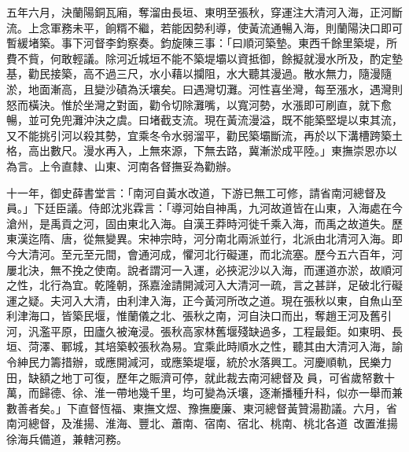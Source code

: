 \begin{pinyinscope}
五年六月，決蘭陽銅瓦廂，奪溜由長垣、東明至張秋，穿運注大清河入海，正河斷流。上念軍務未平，餉糈不繼，若能因勢利導，使黃流通暢入海，則蘭陽決口即可暫緩堵築。事下河督李鈞察奏。鈞旋陳三事：「曰順河築墊。東西千餘里築堤，所費不貲，何敢輕議。除河近城垣不能不築堤壩以資抵御，餘擬就漫水所及，酌定墊基，勸民接築，高不過三尺，水小藉以攔阻，水大聽其漫過。散水無力，隨漫隨淤，地面漸高，且變沙磧為沃壤矣。曰遇灣切灘。河性喜坐灣，每至漲水，遇灣則怒而橫決。惟於坐灣之對面，勸令切除灘嘴，以寬河勢，水漲即可刷直，就下愈暢，並可免兜灘沖決之虞。曰堵截支流。現在黃流漫溢，既不能築堅堤以束其流，又不能挑引河以殺其勢，宜乘冬令水弱溜平，勸民築壩斷流，再於以下溝槽跨築土格，高出數尺。漫水再入，上無來源，下無去路，冀漸淤成平陸。」東撫崇恩亦以為言。上令直隸、山東、河南各督撫妥為勸辦。

十一年，御史薛書堂言：「南河自黃水改道，下游已無工可修，請省南河總督及員。」下廷臣議。侍郎沈兆霖言：「導河始自神禹，九河故道皆在山東，入海處在今滄州，是禹貢之河，固由東北入海。自漢王莽時河徙千乘入海，而禹之故道失。歷東漢迄隋、唐，從無變異。宋神宗時，河分南北兩派並行，北派由北清河入海。即今大清河。至元至元間，會通河成，懼河北行礙運，而北流塞。歷今五六百年，河屢北決，無不挽之使南。說者謂河一入運，必挾泥沙以入海，而運道亦淤，故順河之性，北行為宜。乾隆朝，孫嘉淦請開減河入大清河一疏，言之甚詳，足破北行礙運之疑。夫河入大清，由利津入海，正今黃河所改之道。現在張秋以東，自魚山至利津海口，皆築民堰，惟蘭儀之北、張秋之南，河自決口而出，奪趙王河及舊引河，汎濫平原，田廬久被淹浸。張秋高家林舊堰殘缺過多，工程最鉅。如東明、長垣、菏澤、鄆城，其培築較張秋為易。宜乘此時順水之性，聽其由大清河入海，諭令紳民力籌措辦，或應開減河，或應築堤堰，統於水落興工。河慶順軌，民樂力田，缺額之地丁可復，歷年之賑濟可停，就此裁去南河總督及員，可省歲帑數十萬，而歸德、徐、淮一帶地幾千里，均可變為沃壤，逐漸播種升科，似亦一舉而兼數善者矣。」下直督恆福、東撫文煜、豫撫慶廉、東河總督黃贊湯勘議。六月，省南河總督，及淮揚、淮海、豐北、蕭南、宿南、宿北、桃南、桃北各道，改置淮揚徐海兵備道，兼轄河務。


\end{pinyinscope}
